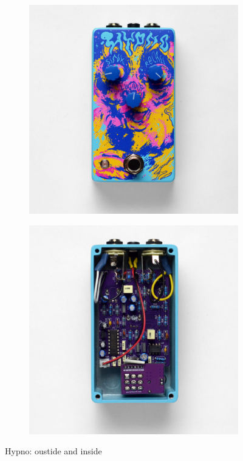 \documentclass[a4paper,12pt]{article}
\begin{document}
\begin{figure}[h!]
  \centering
  \begin{subfigure}[b]{0.49\textwidth}
    \centering
    \includegraphics[width=\textwidth]{hypno-outside-1000px.jpg}
  \end{subfigure}
  \begin{subfigure}[b]{0.49\textwidth}
    \centering
    \includegraphics[width=\textwidth]{hypno-inside-1000px.jpg}
  \end{subfigure}
  \caption{Hypno: oustide and inside}
  \label{fig:Hypno}
\end{figure}
\end{document}
